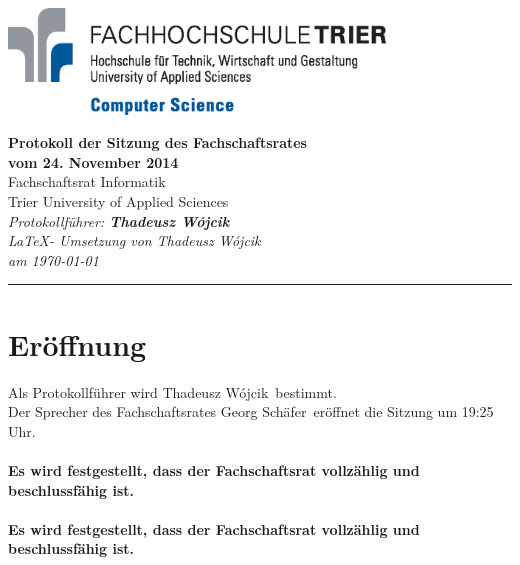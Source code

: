 \documentclass[a4paper, 11pt]{article} %
\newcommand{\protokoller}{Thadeusz W{\'o}jcik}
\newcommand{\dateOfMeeting}{24. November 2014}
\newcommand{\TeXer}{Thadeusz W{\'o}jcik}
\newcommand{\fsiPresident}{Georg Sch{\"a}fer}
\begin{document}

\doublespacing
\thispagestyle{empty}

\begin{center}
\includegraphics[width=10.0cm]{../logo_faculty_computer_science.eps}

\vspace*{\fill}
{\LARGE \textbf{Protokoll der Sitzung des Fachschaftsrates \\vom \dateOfMeeting}}\\
Fachschaftsrat Informatik\\
Trier University of Applied Sciences\\
\vspace{2.5cm}
\textit{
	Protokollführer: \textbf{\protokoller} \\
	\LaTeX - Umsetzung von \TeXer\\
	am \today
}
\vfill
\end{center}

\hspace*{-35cm}
\textcolor{fsi}{\rule{64.9cm}{15pt}}
\pagebreak
 
\setcounter{tocdepth}{2}
\tableofcontents 
\pagebreak

\section{Eröffnung}
Als Protokollführer wird \protokoller~bestimmt.\\
Der Sprecher des Fachschaftsrates \fsiPresident~eröffnet die Sitzung um 19:25 Uhr.
\\\\
\textbf{Es wird festgestellt, dass der Fachschaftsrat vollzählig und beschlussfähig ist.}
\\\\
\textbf{Es wird festgestellt, dass der Fachschaftsrat vollzählig und beschlussfähig ist.}
\end{document}
